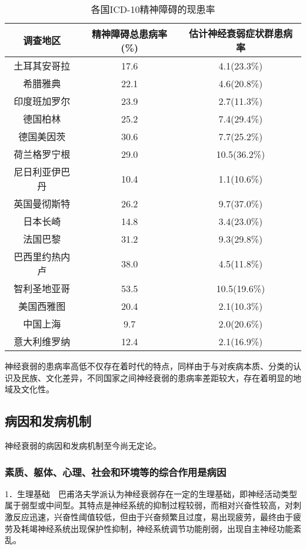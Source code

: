 \begin{table}
    \centering
    \caption{各国ICD-10精神障碍的现患率}
    \label{tab11-2}
    \begin{tabular}{ccc}
    \toprule
    调查地区 & 精神障碍总患病率(\%) & 估计神经衰弱症状群患病率 \\
    \midrule
土耳其安哥拉 & 17.6 & 4.1(23.3\%)\\
希腊雅典& 22.1 & 4.6(20.8\%)\\
印度班加罗尔& 23.9 & 2.7(11.3\%)\\
德国柏林& 25.2 & 7.4(29.4\%)\\
德国美因茨& 30.6 & 7.7(25.2\%)\\
荷兰格罗宁根& 29.0 & 10.5(36.2\%)\\
尼日利亚伊巴丹& 10.4 & 1.1(10.6\%)\\
英国曼彻斯特& 26.2 & 9.7(37.0\%)\\
日本长崎& 14.8 & 3.4(23.0\%)\\
法国巴黎& 31.2 & 9.3(29.8\%)\\
巴西里约热内卢& 38.0 & 4.5(11.8\%)\\
智利圣地亚哥& 53.5 & 10.5(19.6\%)\\
美国西雅图& 20.4 & 2.1(10.3\%)\\
中国上海& 9.7 & 2.0(20.6\%)\\
意大利维罗纳& 12.4 & 2.1(16.9\%)\\
    \bottomrule
    \end{tabular}
    \end{table}

神经衰弱的患病率高低不仅存在着时代的特点，同样由于与对疾病本质、分类的认识及民族、文化差异，不同国家之间神经衰弱的患病率差距较大，存在着明显的地域及文化性。

\subsection{病因和发病机制}

神经衰弱的病因和发病机制至今尚无定论。

\subsubsection{素质、躯体、心理、社会和环境等的综合作用是病因}

1．生理基础　巴甫洛夫学派认为神经衰弱存在一定的生理基础，即神经活动类型属于弱型或中间型。其特点是神经系统的抑制过程较弱，而相对兴奋性较高，对刺激反应迅速，兴奋性阈值较低，但由于兴奋频繁且过度，易出现疲劳，最终由于疲劳及耗竭神经系统出现保护性抑制，神经系统调节功能削弱，出现自主神经功能紊乱。

